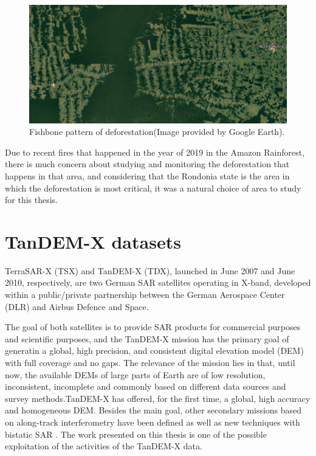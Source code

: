 \begin{figure}[H]
    \centering
    \includegraphics[width=0.8\linewidth]{Chapter2-real/fishbone.png}
    \caption{Fishbone pattern of deforestation(Image provided by Google Earth). }
    \label{fig:fishbone}
\end{figure}{}

Due to recent fires that happened in the year of 2019 in the Amazon Rainforest, there is much concern about studying and monitoring the deforestation that happens in that area, and considering that the Rondonia state is the area in which the deforestation is most critical, it was a natural choice of area to study for this thesis. 

\section{TanDEM-X datasets}
TerraSAR-X (TSX) and TanDEM-X (TDX), launched in June 2007 and June 2010, respectively, are two German SAR satellites operating in X-band, developed within a public/private partnership
between the German Aerospace Center (DLR) and Airbus Defence and Space. 


The goal of both satellites is to provide SAR products for commercial purposes and scientific purposes, and the TanDEM-X mission has the primary goal of generatin a global, high precision, and consistent digital elevation model (DEM) with full coverage and no gaps. The relevance of the mission lies in that, until now, the available DEMs
of large parts of Earth are of low resolution, inconsistent, incomplete and commonly
based on different data sources and survey methods.\newline TanDEM-X has offered, for the first
time, a global, high accuracy and homogeneous DEM. Besides the main goal, other secondary missions based on along-track interferometry have been defined as well
as new techniques with bistatic SAR \cite{vintetres, vintequatro}. The work presented on this thesis is one of the possible exploitation of the activities of the TanDEM-X data.

